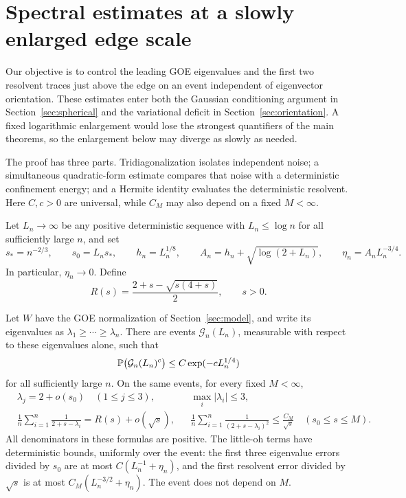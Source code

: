 \section{Spectral estimates at a slowly enlarged edge scale}
\label{sec:spectral}

Our objective is to control the leading GOE eigenvalues and the first
two resolvent traces just above the edge on an event independent of
eigenvector orientation. These estimates enter both the Gaussian
conditioning argument in Section~\ref{sec:spherical} and the variational
deficit in Section~\ref{sec:orientation}. A fixed logarithmic enlargement
would lose the strongest quantifiers of the main theorems, so the
enlargement below may diverge as slowly as needed.

The proof has three parts. Tridiagonalization isolates independent noise;
a simultaneous quadratic-form estimate compares that noise with a
deterministic confinement energy; and a Hermite identity evaluates the
deterministic resolvent. Here $C,c>0$ are universal, while $C_M$ may also
depend on a fixed $M<\infty$.

Let $L_n\to\infty$ be any positive deterministic sequence with $L_n\le\log n$ for
all sufficiently large $n$, and set
\begin{equation}
 s_*=n^{-2/3},\qquad s_0=L_ns_*,\qquad
 h_n=L_n^{1/8},\qquad
 A_n=h_n+\sqrt{\log(2+L_n)},\qquad
 \eta_n=A_nL_n^{-3/4}.
 \label{eq:spectral-scales}
\end{equation}
In particular, $\eta_n\to0$.  Define
\[
 R(s)=\frac{2+s-\sqrt{s(4+s)}}2,\qquad s>0.
\]

\begin{proposition}
\label{prop:spectral}
Let $W$ have the GOE normalization of Section~\ref{sec:model}, and write its
eigenvalues as $\lambda_1\ge\cdots\ge\lambda_n$.  There are events
$\mathcal G_n(L_n)$, measurable with respect to these eigenvalues alone,
such that
\[
 \mathbb P\bigl(\mathcal G_n(L_n)^c\bigr)
 \le C\exp(-cL_n^{1/4})
\]
for all sufficiently large $n$.  On the same events, for every fixed
$M<\infty$,
\begin{equation}
\begin{aligned}
 &\lambda_j=2+o(s_0)\quad(1\le j\le3),
 &&\max_i|\lambda_i|\le3,\\
 &\frac1n\sum_{i=1}^n\frac1{2+s-\lambda_i}
     =R(s)+o(\sqrt s),
 &&\frac1n\sum_{i=1}^n\frac1{(2+s-\lambda_i)^2}
     \le\frac{C_M}{\sqrt s}
 \quad(s_0\le s\le M).
\end{aligned}
\label{eq:spectral-estimates}
\end{equation}
All denominators in these formulas are positive.  The little-oh terms have
deterministic bounds, uniformly over the event: the first three eigenvalue
errors divided by $s_0$ are at most $C(L_n^{-1}+\eta_n)$, and the first
resolvent error divided by $\sqrt s$ is at most
$C_M(L_n^{-3/2}+\eta_n)$.  The event does not depend on $M$.
\end{proposition}

